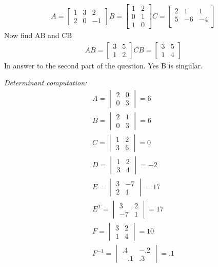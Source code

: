 \documentclass[11pt]{article}
\begin{document}
\item 
\begin{gather}
A =
\begin{bmatrix}
1 & 3 & 2 \\
2 & 0 & -1
\end{bmatrix}
B = 
\begin{bmatrix}
1 & 2\\
0 & 1 \\
1 & 0
\end{bmatrix}
C = 
\begin{bmatrix}
2 & 1 & 1 \\
5 & -6 & -4 \\
\end{bmatrix}
\end{gather}
Now find AB and CB
\begin{gather}
AB= 
\begin{bmatrix}
3 & 5\\
1 & 2
\end{bmatrix}
CB = 
\begin{bmatrix}
3 & 5 \\
1 & 4
\end{bmatrix}
\end{gather}
In answer to the second part of the question. Yes B is singular.
\item \emph{Determinant computation:}
\begin{gather}
A=
\begin{vmatrix}
2 & 0\\
0 & 3
\end{vmatrix}
= 6 \\ B = 
\begin{vmatrix}
2 & 1\\
0 & 3
\end{vmatrix}
= 6 \\ C = 
\begin{vmatrix}
1 & 2\\
3 & 6
\end{vmatrix}
= 0 \\ D =
\begin{vmatrix}
1 & 2\\
3 & 4
\end{vmatrix}
= -2 \\ E = 
\begin{vmatrix}
3 & -7 \\
2 & 1
\end{vmatrix}
= 17 \\ E^T =
\begin{vmatrix}
3 & 2 \\
-7 & 1
\end{vmatrix}
= 17 \\ F = 
\begin{vmatrix}
3 & 2 \\
1 & 4
\end{vmatrix}
=10 \\F^{-1} =
\begin{vmatrix}
.4 & -.2\\
-.1 &.3
\end{vmatrix}
= .1
\end{gather}
\end{document}
